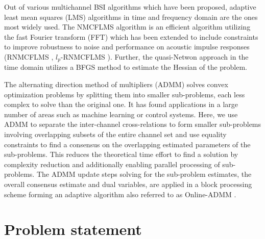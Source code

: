 \documentclass{article}
\begin{document}
Out of various multichannel BSI algorithms which have been proposed, adaptive least mean squares (LMS) algorithms in time and frequency domain \cite{huangAdaptiveMultichannelLeast2002,huangClassFrequencydomainAdaptive2003} are the ones most widely used.
The NMCFLMS algorithm is an efficient algorithm utilizing the fast Fourier transform (FFT) which has been extended to include constraints to improve robustness to noise and performance on acoustic impulse responses (RNMCFLMS \cite{huNoiseRobustBlind2015}, \(l_p\)-RNMCFLMS \cite{heNoiseRobustFrequencyDomain2018,joRobustBlindMultichannel2021}).
Further, the quasi-Netwon \cite{habetsOnlineQuasiNewtonAlgorithm2010} approach in the time domain utilizes a BFGS method to estimate the Hessian of the problem.

The alternating direction method of multipliers (ADMM) \cite{boydDistributedOptimizationStatistical2011} solves convex optimization problems by splitting them into smaller sub-problems, each less complex to solve than the original one.
It has found applications in a large number of areas such as machine learning or control systems.
Here, we use ADMM to separate the inter-channel cross-relations to form smaller sub-problems involving overlapping subsets of the entire channel set and use equality constraints to find a consensus on the overlapping estimated parameters of the sub-problems.
This reduces the theoretical time effort to find a solution by complexity reduction and additionally enabling parallel processing of sub-problems.
The ADMM update steps solving for the sub-problem estimates, the overall consensus estimate and dual variables, are applied in a block processing scheme forming an adaptive algorithm also referred to as Online-ADMM \cite{wangOnlineAlternatingDirection2013,hosseiniOnlineDistributedADMM2014}.



\section{Problem statement}
\label{sec:problem_statement}


\end{document}
